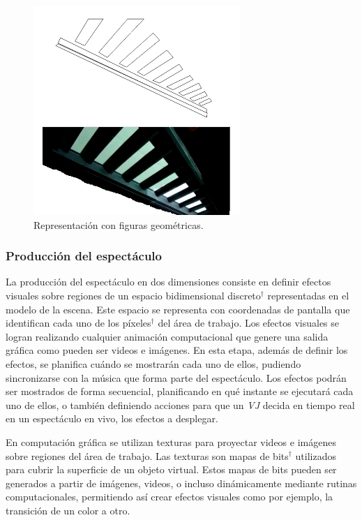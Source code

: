 \begin{figure}[H]
  \centering
	\includegraphics[width=0.7\textwidth]{./Cap2_videomapping/RepresentacionconfigurasGeometricas}
  \caption[Imagen propia]{Representación con figuras geométricas.}
  \label{fig:RepresentacionconfigurasGeometricas}
\end{figure}

\subsubsection{Producción del espectáculo}
La producción del espectáculo en dos dimensiones consiste en definir efectos visuales sobre regiones de un espacio bidimensional discreto$^\dagger$ representadas en el modelo de la escena. Este espacio se representa con coordenadas de pantalla que identifican cada uno de los píxeles$^\dagger$ del área de trabajo. Los efectos visuales se logran realizando cualquier animación computacional que genere una salida gráfica como pueden ser videos e imágenes.
En esta etapa, además de definir los efectos, se planifica cuándo se mostrarán cada uno de ellos, pudiendo sincronizarse con la música que forma parte del espectáculo.
Los efectos podrán ser mostrados de forma secuencial, planificando en qué instante se ejecutará cada uno de ellos, o también definiendo acciones para que un \emph{VJ} decida en tiempo real en un espectáculo en vivo, los efectos a desplegar.

En computación gráfica se utilizan texturas para proyectar videos e imágenes sobre regiones del área de trabajo. Las texturas son mapas de bits$^\dagger$ utilizados para cubrir la superficie de un objeto virtual. Estos mapas de bits pueden ser generados a partir de imágenes, videos, o incluso dinámicamente mediante rutinas computacionales, permitiendo así crear efectos visuales como por ejemplo, la transición de un color a otro.


